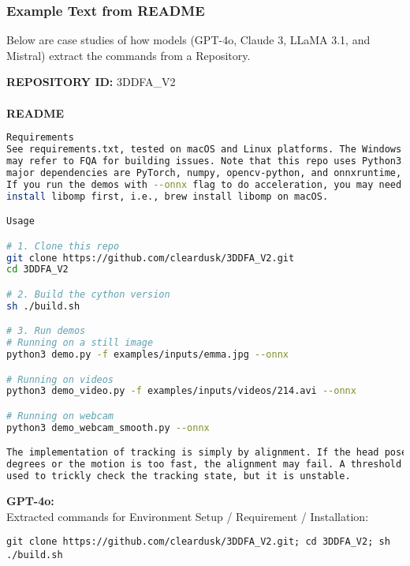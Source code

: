 \subsubsection{Example Text from README}

Below are case studies of how models (GPT-4o, Claude 3, LLaMA 3.1, and Mistral) extract the commands from a Repository.


\begin{table*}[th!]
\fontsize{9.0pt}{\baselineskip}\selectfont
\linespread{0.9}\selectfont
\begin{mybody}
\textbf{REPOSITORY ID:} 3DDFA\_V2 \\\\
\textbf{README} \begin{lstlisting}[language=bash]
Requirements
See requirements.txt, tested on macOS and Linux platforms. The Windows users 
may refer to FQA for building issues. Note that this repo uses Python3. The 
major dependencies are PyTorch, numpy, opencv-python, and onnxruntime, etc. 
If you run the demos with --onnx flag to do acceleration, you may need to 
install libomp first, i.e., brew install libomp on macOS.

Usage

# 1. Clone this repo
git clone https://github.com/cleardusk/3DDFA_V2.git
cd 3DDFA_V2

# 2. Build the cython version
sh ./build.sh

# 3. Run demos
# Running on a still image
python3 demo.py -f examples/inputs/emma.jpg --onnx

# Running on videos
python3 demo_video.py -f examples/inputs/videos/214.avi --onnx

# Running on webcam
python3 demo_webcam_smooth.py --onnx

The implementation of tracking is simply by alignment. If the head pose > 90 
degrees or the motion is too fast, the alignment may fail. A threshold is 
used to trickly check the tracking state, but it is unstable.
\end{lstlisting}
\end{mybody}
\begin{mybody}
\textbf{GPT-4o:}\\
Extracted commands for Environment Setup / Requirement / Installation:
\begin{verbatim}
git clone https://github.com/cleardusk/3DDFA_V2.git; cd 3DDFA_V2; sh ./build.sh
\end{verbatim}


\end{mybody}
\end{table*}
